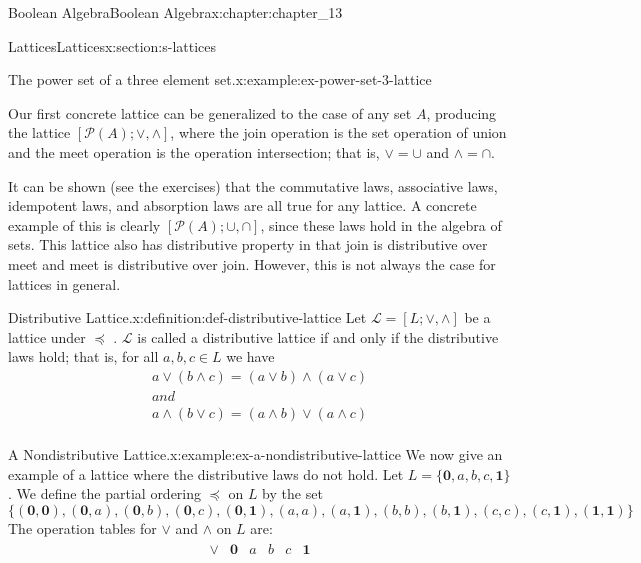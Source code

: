 \documentclass[oneside,10pt,]{book}
\numberwithin{equation}{section}
\begin{document}
\begin{chapterptx}{Boolean Algebra}{}{Boolean Algebra}{}{}{x:chapter:chapter_13}
\begin{sectionptx}{Lattices}{}{Lattices}{}{}{x:section:s-lattices}
\begin{example}{The power set of a three element set.}{x:example:ex-power-set-3-lattice}
\end{example}
Our first concrete lattice can be generalized to the case of any set \(A\), producing the lattice \([\mathcal{P}(A); \lor, \land]\), where the join operation is the set operation of union and the meet operation is the operation intersection; that is, \(\lor =\cup\) and \(\land =\cap\).%
\par
It can be shown (see the exercises) that the commutative laws, associative laws, idempotent laws, and absorption laws are all true for any lattice.  A concrete example of this is clearly \([\mathcal{P}(A); \cup, \cap  ]\), since these laws hold in the algebra of sets.  This lattice also has distributive property in that join is distributive over meet and meet is distributive over join. However, this is not always the case for lattices in general.%
\begin{definition}{Distributive Lattice.}{x:definition:def-distributive-lattice}%
%
Let \(\mathcal{L}=[L; \lor, \land ]\) be a lattice under \(\preceq\)	.  \(\mathcal{L}\) is called a distributive lattice if and only if the distributive laws hold; that is, for all \(a, b, c \in  L\) we have%
\begin{equation*}
\begin{array}{c}
a \lor  (b \land  c) = (a \lor  b) \land  (a \lor  c)\\
and \\
a \land  (b \lor  c) = (a \land  b) \lor  (a \land  c)\\
\end{array}
\end{equation*}
%
\end{definition}
\begin{example}{A Nondistributive Lattice.}{x:example:ex-a-nondistributive-lattice}%
We now give an example of a lattice where the distributive laws do not hold. Let \(L = \{\pmb{0},a,b,c,\pmb{1}\}\). We define the partial ordering \(\preceq\) on \(L\) by the set%
\begin{equation*}
\{(\pmb{0},\pmb{0}),(\pmb{0},a),(\pmb{0},b),(\pmb{0},c),(\pmb{0},\pmb{1}),(a,a),(a,\pmb{1}),(b,b),(b,\pmb{1}),(c,c),(c,\pmb{1}),(\pmb{1},\pmb{1})\}
\end{equation*}
The operation tables for \(\lor\) and \(\land\) on \(L\) are:%
\begin{equation*}
\begin{array}{cc}
\begin{array}{c|ccccc}
\lor  & 	 \pmb{0} &  a  & b  &  c &  \pmb{1} \\

\end{array}
\end{array}
\end{equation*}
\end{example}
\end{sectionptx}
\end{chapterptx}
\end{document}

